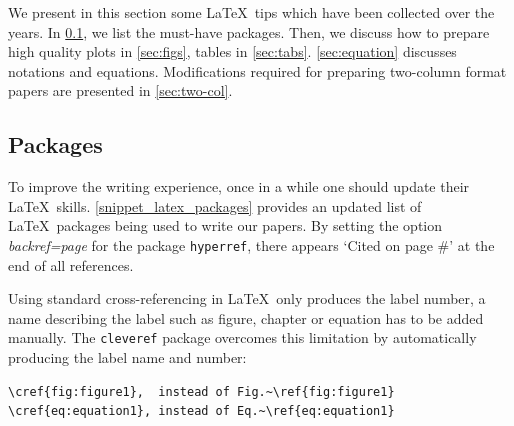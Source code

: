 \documentclass[authoryear,3p,times,preprint,review,fleqn]{elsarticle}
\numberwithin{equation}{section}
\theoremstyle{remark}
\begin{document}
We present in this section some \LaTeX\ tips which have been collected over the years. In \cref{sec:packages}, we list the must-have packages. Then, we discuss how to prepare high quality plots in \cref{sec:figs}, tables in 
\cref{sec:tabs}. \cref{sec:equation} discusses notations and equations. Modifications required for preparing two-column format papers are presented in \cref{sec:two-col}.

\subsection{Packages}\label{sec:packages}

To improve the writing experience, once in a while one should update their \LaTeX\ skills. \cref{snippet_latex_packages} provides an updated list of \LaTeX\ packages being used to write our papers.
By setting the option \textit{backref=page} for the package \texttt{hyperref}, there appears `Cited on page \#' at the end of all references. 

Using standard cross-referencing in \LaTeX\ only produces the label number, a name describing the label such as figure, chapter or equation has to be added manually. The \texttt{cleveref} package overcomes this limitation by automatically producing the label name and number:

\begin{verbatim}
\cref{fig:figure1},  instead of Fig.~\ref{fig:figure1}
\cref{eq:equation1}, instead of Eq.~\ref{eq:equation1}
\end{verbatim}
\end{document}
